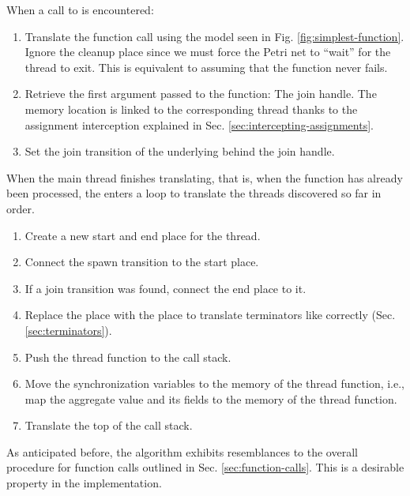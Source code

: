 When a call to  is encountered:

\begin{enumerate}
  \item Translate the function call using the model seen in Fig. \ref{fig:simplest-function}.
        Ignore the cleanup place since we must force the Petri net
        to ``wait'' for the thread to exit.
        This is equivalent to assuming that the  function never fails.
  \item Retrieve the first argument passed to the function: The join handle.
        The memory location is linked to the corresponding thread
        thanks to the assignment interception explained in Sec. \ref{sec:intercepting-assignments}.
  \item Set the join transition of the underlying  behind the join handle.
\end{enumerate}

When the main thread finishes translating, that is,
when the  function has already been processed,
the  enters a loop
to translate the threads discovered so far in order.

\begin{enumerate}
  \item Create a new start and end place for the thread.
  \item Connect the spawn transition to the start place.
  \item If a join transition was found, connect the end place to it.
  \item Replace the place  with the place 
        to translate terminators like  correctly (Sec. \ref{sec:terminators}).
  \item Push the thread function to the call stack.
  \item Move the synchronization variables to the memory of the thread function, i.e.,
        map the aggregate value and its fields to the memory of the thread function.
  \item Translate the top of the call stack.
\end{enumerate}

As anticipated before, the algorithm exhibits resemblances
to the overall procedure for function calls outlined in Sec. \ref{sec:function-calls}.
This is a desirable property in the implementation.